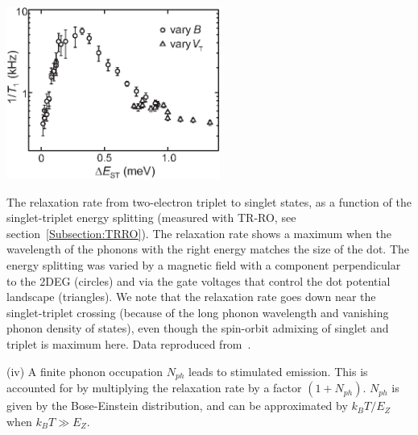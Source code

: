 \documentclass[rmp,twocolumn,aps]{revtex4}
\begin{document}
\bfig
\includegraphics[width=7cm]{hanson_fig21.eps}
\caption{The relaxation rate from two-electron triplet to singlet states, as a function of the singlet-triplet energy splitting (measured with TR-RO, see section~\ref{Subsection:TRRO}). The relaxation rate shows a maximum when the wavelength of the phonons with the right energy matches the size of the dot. The energy splitting was varied by a magnetic field with a component perpendicular to the 2DEG (circles) and via the gate voltages that control the dot potential landscape (triangles). We note that the relaxation rate goes down near the singlet-triplet crossing (because of the long phonon wavelength and vanishing phonon density of states), even though the spin-orbit admixing of singlet and triplet is maximum here. Data reproduced from~\textcite{meunier07}.} \label{fig:meunier_T1} \efig

(iv) A finite phonon occupation $N_{ph}$ leads to stimulated emission. This is accounted for by multiplying the relaxation rate by a factor $(1+N_{ph})$. $N_{ph}$ is given by the Bose-Einstein distribution, and can be approximated by $k_B T / E_Z$ when $k_B T \gg E_Z$.
\end{document}
